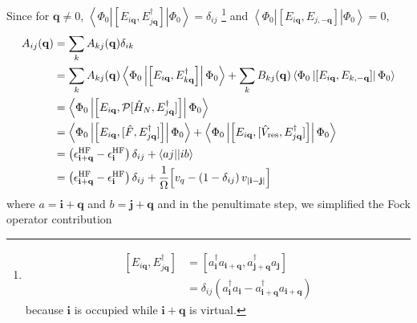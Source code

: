 Since for $\mathbf{q} \neq {0}$, $\left\langle\Phi_0\left|
\left[
E_{i\mathbf q},
E_{j\mathbf q}^{\dagger}
\right]
\right|\Phi_0\right\rangle
=
\delta_{ij}$ 
\footnote{\begin{align}
\left[
E_{i\mathbf q},
E_{j\mathbf q}^{\dagger}
\right]
&=
\left[
a_{\mathbf i}^{\dagger}
a_{\mathbf{i}+\mathbf q},
a_{\mathbf{j}+\mathbf q}^{\dagger}
a_{\mathbf j}
\right]
\\
&=
\delta_{ij}
\left(
a_{\mathbf i}^{\dagger}a_{\mathbf i}
-
a_{\mathbf{i}+\mathbf q}^{\dagger}
a_{\mathbf{i}+\mathbf q}
\right)
\end{align}
because $\mathbf i$ is occupied while
$\mathbf{i}+\mathbf q$ is virtual.}
and $\left\langle\Phi_0\left|
\left[
E_{i\mathbf q},
E_{j,-\mathbf q}
\right]\right|\Phi_0\right\rangle
=
0$, 
\begin{align}
A_{ij}(\mathbf q)&=\sum_k
A_{kj}(\mathbf q)\delta_{ik}\\
&= \sum_k
A_{kj}(\mathbf q)
\left\langle\Phi_0\left|
\left[
E_{i\mathbf q},
E_{k\mathbf q}^{\dagger}
\right]
\right|\Phi_0\right\rangle
+
\sum_k
B_{kj}(\mathbf q)
\left\langle\Phi_0\left|
\left[
E_{i\mathbf q},
E_{k,-\mathbf q}
\right]
\right|\Phi_0\right\rangle\\
&=
\left\langle\Phi_0\left|
\left[
E_{i\mathbf q},
\mathcal P[\hat H_N,E_{j\mathbf q}^{\dagger}]
\right]
\right|\Phi_0\right\rangle\\
&=
\left\langle\Phi_0\left|
\left[
E_{i\mathbf q},
[\hat F,E_{j\mathbf q}^{\dagger}]
\right]
\right|\Phi_0\right\rangle
+
\left\langle\Phi_0\left|
\left[
E_{i\mathbf q},
[\hat V_{\rm res},E_{j\mathbf q}^{\dagger}]
\right]
\right|\Phi_0\right\rangle\\
&= \left( \epsilon^{\rm HF}_{\mathbf i+\mathbf{q}} - \epsilon^{\rm HF}_{\mathbf i} \right)\delta_{ij}
+ \langle aj||ib\rangle\\
&= \left( \epsilon^{\rm HF}_{\mathbf i+\mathbf{q}} - \epsilon^{\rm HF}_{\mathbf i} \right)\delta_{ij}
+ \frac{1}{\Omega}
\Big[
v_q
-
\left(1-\delta_{ij}\right)v_{|\mathbf i-\mathbf j|}
\Big]
\label{eq:A_Fock_plus_interaction}
\end{align}
where $a=\mathbf{i}+\mathbf{q}$ and $b=\mathbf{j}+\mathbf{q}$ and in the penultimate step, we simplified the Fock operator contribution
